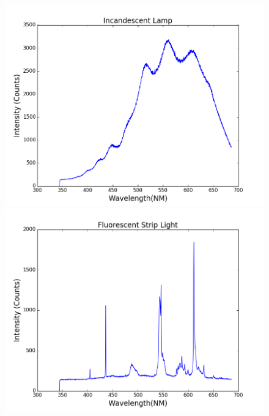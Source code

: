 \documentclass[onecolumn, 12pt, a4paper]{article}
\begin{document}
  \begin{subfigure}{\linewidth}
  \includegraphics[width=.5\linewidth]{Incan.png}
  \includegraphics[width=.5\linewidth]{Fluor.png}
  \end{subfigure}\par\medskip
\end{document}
